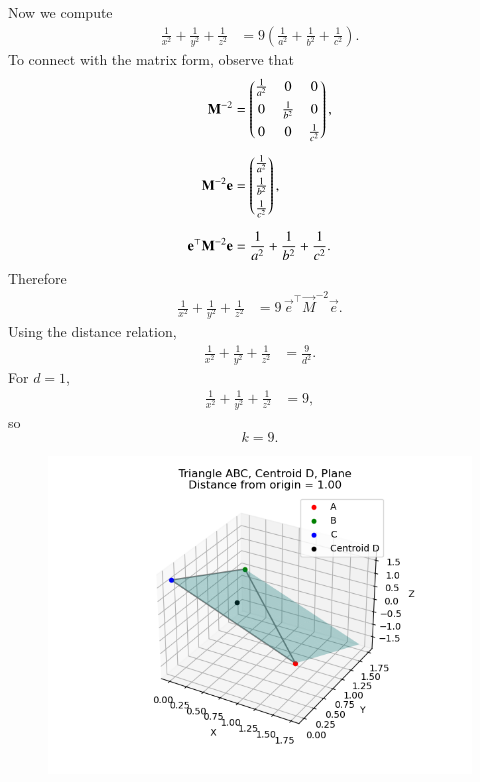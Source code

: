 \documentclass[journal]{IEEEtran}
\begin{document}
Now we compute
\begin{align}
\frac{1}{x^2}+\frac{1}{y^2}+\frac{1}{z^2}
&= 9\left(\frac{1}{a^2}+\frac{1}{b^2}+\frac{1}{c^2}\right).
\end{align}
To connect with the matrix form, observe that
\begin{align}
\mathbf{M}^{-2} &= \begin{pmatrix}\tfrac{1}{a^2}&0&0\\[4pt]0&\tfrac{1}{b^2}&0\\[4pt]0&0&\tfrac{1}{c^2}\end{pmatrix}, \\[6pt]
\mathbf{M}^{-2}\mathbf{e} &= \begin{pmatrix}\tfrac{1}{a^2}\\[4pt]\tfrac{1}{b^2}\\[4pt]\tfrac{1}{c^2}\end{pmatrix}, \\[6pt]
\mathbf{e}^\top \mathbf{M}^{-2}\mathbf{e} &= \frac{1}{a^2}+\frac{1}{b^2}+\frac{1}{c^2}.
\end{align}
Therefore
\begin{align}
\frac{1}{x^2}+\frac{1}{y^2}+\frac{1}{z^2}
&= 9\,\vec{e}^\top \vec{M}^{-2} \vec{e}.
\end{align}
Using the distance relation,
\begin{align}
\frac{1}{x^2}+\frac{1}{y^2}+\frac{1}{z^2} &= \frac{9}{d^2}.
\end{align}
For $d=1$,
\begin{align}
\frac{1}{x^2}+\frac{1}{y^2}+\frac{1}{z^2} &= 9,
\end{align}
so
\[
\boxed{k=9}.
\]
\begin{figure}[H]
    \centering
    \includegraphics[width=0.7\linewidth]{figs/fig1.png}
    \caption{}
    \label{fig:fig1}
\end{figure}
\end{document}

